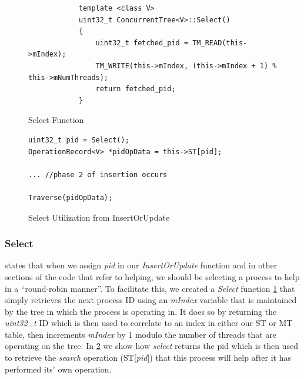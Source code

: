 \documentclass[letterpaper, 10 pt, conference]{ieeeconf}
\begin{document}
	\begin{figure}
		\begin{lstlisting}
			template <class V>
			uint32_t ConcurrentTree<V>::Select()
			{
				uint32_t fetched_pid = TM_READ(this->mIndex);
				TM_WRITE(this->mIndex, (this->mIndex + 1) % this->mNumThreads);
				return fetched_pid;
			}
		\end{lstlisting}
		\caption{Select Function}
		\label{selectfunction}
	\end{figure}

\begin{figure}
\begin{lstlisting}
uint32_t pid = Select();
OperationRecord<V> *pidOpData = this->ST[pid];

... //phase 2 of insertion occurs

Traverse(pidOpData);
\end{lstlisting}
\caption{Select Utilization from InsertOrUpdate}
\label{selectfunctionexample}
\end{figure}

\subsubsection{Select}
\cite{c1} states that when we assign \textit{pid} in our \textit{InsertOrUpdate} function and in other sections of the code that refer to helping, we should be selecting a process to help in a ``round-robin manner''. To facilitate this, we created a \textit{Select} function \ref{selectfunction} that simply retrieves the next process ID using an \textit{mIndex} variable that is maintained by the tree in which the process is operating in. It does so by returning the \textit{uint32\_t} ID which is then used to correlate to an index in either our ST or MT table, then increments \textit{mIndex} by 1 modulo the number of threads that are operating on the tree. In \ref{selectfunctionexample} we show how \textit{select} returns the pid which is then used to retrieve the \textit{search} operation (ST[\textit{pid}]) that this process will help after it has performed its' own operation.
\end{document}
